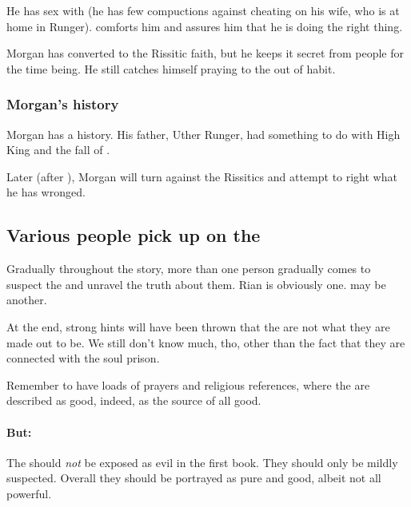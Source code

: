 He has sex with \Takestsha{} (he has few compuctions against cheating on his wife, who is at home in Runger). \Takestsha{} comforts him and assures him that he is doing the right thing. 

Morgan has converted to the Rissitic faith, but he keeps it secret from people for the time being. He still catches himself praying to the \Sephiroth{} out of habit. 





\subsubsection{Morgan's history}
Morgan has a history. His father, Uther Runger, had something to do with High King \LastHighKing{} and the fall of . 

Later (after \TwilightAngelRememberEmph), Morgan will turn against the Rissitics and attempt to right what he has wronged. 









\subsection{Various people pick up on the \Sephiroth}
Gradually throughout the story, more than one person gradually comes to suspect the \Sephiroth{} and unravel the truth about them. 
Rian is obviously one. 
\Tiroco{} may be another. 

At the end, strong hints will have been thrown that the \Sephiroth{} are not what they are made out to be. We still don't know much, tho, other than the fact that they are connected with the soul prison. 

Remember to have loads of prayers and religious references, where the \Sephiroth{} are described as good, indeed, as the source of all good. 


\paragraph{But:} 
The \sephiroth should \emph{not} be exposed as evil in the first book. 
They should only be mildly suspected.
Overall they should be portrayed as pure and good, albeit not all powerful. 

